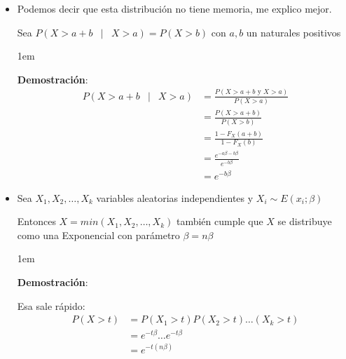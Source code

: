 \documentclass[12pt, fleqn]{report}                             %
\newenvironment{SmallIndentation}[1][0.75em]                    %
        {\begin{adjustwidth}{#1}{}\begin{footnotesize}}             %
        {\end{footnotesize}\end{adjustwidth}}                       %
\DeclareMathOperator \Space     {\quad}                         %
\DeclareMathOperator \MiniSpace {\;}                            %
\newcommand \Such           {\MiniSpace | \MiniSpace}           %
\theoremstyle{break}                                            %
\begin{document}
                \begin{itemize}
                    \item 
                        Podemos decir que esta distribución no tiene memoria, me explico
                        mejor.

                        Sea $P(X > a + b \Such X > a) = P(X > b)$ con $a, b$ un naturales positivos

                        \begin{SmallIndentation}[1em]
                            \textbf{Demostración}:
                            \begin{align*}
                                P(X > a + b \Such X > a)
                                    &= \frac{P(X > a + b \text{ y } X > a)}{P(X > a)}       \\  
                                    &= \frac{P(X > a + b)}{P(X > b)}                        \\
                                    &= \frac{1 - F_X(a+b)}{1 - F_X(b)}                      \\
                                    &= \frac{e^{-a\beta - b\beta}}{e^{-b\beta}}             \\
                                    &= e^{-b\beta}    
                            \end{align*}    
                        
                        \end{SmallIndentation}
                            
                    \item 
                        Sea $X_1, X_2, \dots, X_k$ variables aleatorias independientes
                        y $X_i \sim E(x_i; \beta)$ 

                        Entonces $X = min(X_1, X_2, \dots, X_k)$ también cumple que $X$ se distribuye como
                        una Exponencial con parámetro $\beta = n\beta$

                        \begin{SmallIndentation}[1em]
                            \textbf{Demostración}:

                            Esa sale rápido:
                            \begin{align*}
                                P(X > t)
                                    &= P(X_1 > t) P(X_2 > t) \dots (X_k > t)        \\
                                    &= e^{-t\beta} \dots e^{-t\beta}                \\
                                    &= e^{-t (n\beta)}
                            \end{align*}


\end{SmallIndentation}
\end{itemize}
\end{document}
